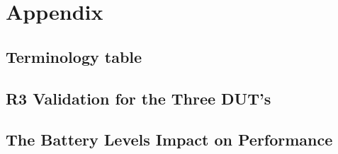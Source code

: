 \chapter{Appendix}\label{ch:appAlabel}

\section{Terminology table}


\newpage


\newpage


\newpage

\section{R3 Validation for the Three DUT's}\label{app:r3_validation}










\newpage



\section{The Battery Levels Impact on Performance}\label{app:charge}



\newpage

